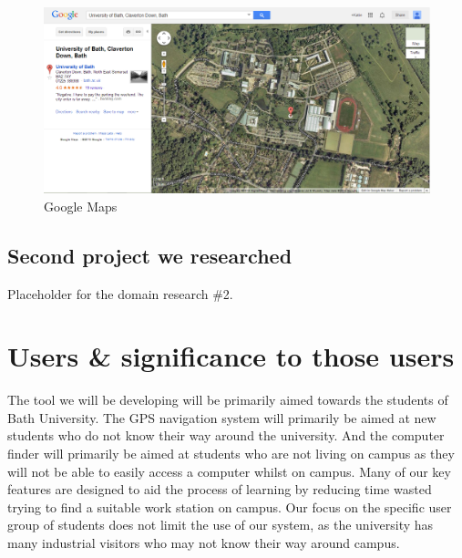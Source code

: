 \documentclass[10pt,a4paper,oneside]{report}
\begin{document}
\begin{figure}[H]
 \caption{Google Maps}
 \centering
 \includegraphics[keepaspectratio, width=\textwidth]{googlemapsexample.png}
\end{figure}

\subsection*{Second project we researched}
Placeholder for the domain research \#2.





\section*{Users \& significance to those users}
The tool we will be developing will be primarily aimed towards the students of Bath University.  The GPS navigation system will primarily be aimed at new students who do not know their way around the university. And the computer finder will primarily be aimed at students who are not living on campus as they will not be able to easily access a computer whilst on campus. Many of our key features are designed to aid the process of learning by reducing time wasted trying to find a suitable work station on campus. Our focus on the specific user group of students does not limit the use of our system, as the university has many industrial visitors who may not know their way around campus.
\end{document}

